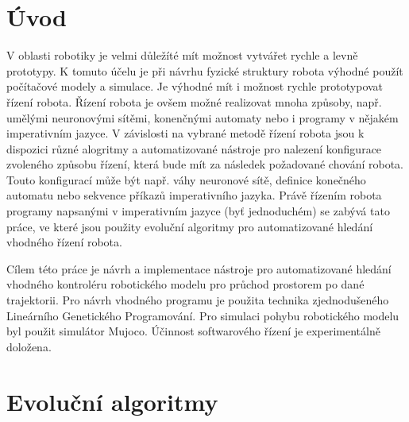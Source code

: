 
\chapter{Úvod}
V oblasti robotiky je velmi důležíté mít možnost vytvářet rychle a levně prototypy.
K tomuto účelu je při návrhu fyzické struktury robota výhodné použít počítačové modely a simulace.
Je výhodné mít i možnost rychle prototypovat řízení robota.
Řízení robota je ovšem možné realizovat mnoha způsoby, např. umělými neuronovými sítěmi, konenčnými automaty nebo i programy v nějakém imperativním jazyce.
V závislosti na vybrané metodě řízení robota jsou k dispozici různé alogritmy a automatizované nástroje pro nalezení konfigurace zvoleného způsobu řízení, která bude mít za následek požadované chování robota.
Touto konfigurací může být např. váhy neuronové sítě, definice konečného automatu nebo sekvence příkazů imperativního jazyka.
Právě řízením robota programy napsanými v imperativním jazyce (byť jednoduchém) se zabývá tato práce, ve které jsou použity evoluční algoritmy pro automatizované hledání vhodného řízení robota.

Cílem této práce je návrh a implementace nástroje pro automatizované hledání vhodného kontroléru robotického modelu pro průchod prostorem po dané trajektorii.
Pro návrh vhodného programu je použita technika zjednodušeného Lineárního Genetického Programování.
Pro simulaci pohybu robotického modelu byl použit simulátor Mujoco.
Účinnost softwarového řízení je experimentálně doložena.



\chapter{Evoluční algoritmy}

